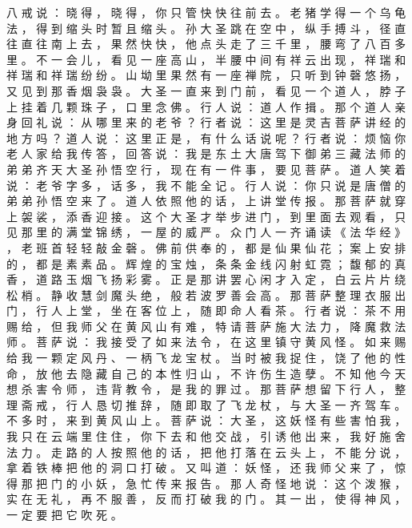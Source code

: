 {八 戒 说 ： 晓 得 ， 晓 得 ， 你 只 管 快 快 往 前 去 。
老 猪 学 得 一 个 乌 龟 法 ， 得 到 缩 头 时 暂 且 缩 头 。
孙 大 圣 跳 在 空 中 ， 纵 手 搏 斗 ， 径 直 往 直 往 南 上 去 ， 果 然 快 快 ， 他 点 头 走 了 三 千 里 ， 腰 弯 了 八 百 多 里 。
不 一 会 儿 ， 看 见 一 座 高 山 ， 半 腰 中 间 有 祥 云 出 现 ， 祥 瑞 和 祥 瑞 和 祥 瑞 纷 纷 。
山 坳 里 果 然 有 一 座 禅 院 ， 只 听 到 钟 磬 悠 扬 ， 又 见 到 那 香 烟 袅 袅 。
大 圣 一 直 来 到 门 前 ， 看 见 一 个 道 人 ， 脖 子 上 挂 着 几 颗 珠 子 ， 口 里 念 佛 。
行 人 说 ： 道 人 作 揖 。
那 个 道 人 亲 身 回 礼 说 ： 从 哪 里 来 的 老 爷 ？ 行 者 说 ： 这 里 是 灵 吉 菩 萨 讲 经 的 地 方 吗 ？ 道 人 说 ： 这 里 正 是 ， 有 什 么 话 说 呢 ？ 行 者 说 ： 烦 恼 你 老 人 家 给 我 传 答 ， 回 答 说 ： 我 是 东 土 大 唐 驾 下 御 弟 三 藏 法 师 的 弟 弟 齐 天 大 圣 孙 悟 空 行 ， 现 在 有 一 件 事 ， 要 见 菩 萨 。
道 人 笑 着 说 ： 老 爷 字 多 ， 话 多 ， 我 不 能 全 记 。
行 人 说 ： 你 只 说 是 唐 僧 的 弟 弟 孙 悟 空 来 了 。
道 人 依 照 他 的 话 ， 上 讲 堂 传 报 。
那 菩 萨 就 穿 上 袈 裟 ， 添 香 迎 接 。
这 个 大 圣 才 举 步 进 门 ， 到 里 面 去 观 看 ， 只 见 那 里 的 满 堂 锦 绣 ， 一 屋 的 威 严 。
众 门 人 一 齐 诵 读 《 法 华 经 》 ， 老 班 首 轻 轻 敲 金 磬 。
佛 前 供 奉 的 ， 都 是 仙 果 仙 花 ； 案 上 安 排 的 ， 都 是 素 素 品 。
辉 煌 的 宝 烛 ， 条 条 金 线 闪 射 虹 霓 ； 馥 郁 的 真 香 ， 道 路 玉 烟 飞 扬 彩 雾 。
正 是 那 讲 罢 心 闲 才 入 定 ， 白 云 片 片 绕 松 梢 。
静 收 慧 剑 魔 头 绝 ， 般 若 波 罗 善 会 高 。
那 菩 萨 整 理 衣 服 出 门 ， 行 人 上 堂 ， 坐 在 客 位 上 ， 随 即 命 人 看 茶 。
行 者 说 ： 茶 不 用 赐 给 ， 但 我 师 父 在 黄 风 山 有 难 ， 特 请 菩 萨 施 大 法 力 ， 降 魔 救 法 师 。
菩 萨 说 ： 我 接 受 了 如 来 法 令 ， 在 这 里 镇 守 黄 风 怪 。
如 来 赐 给 我 一 颗 定 风 丹 、 一 柄 飞 龙 宝 杖 。
当 时 被 我 捉 住 ， 饶 了 他 的 性 命 ， 放 他 去 隐 藏 自 己 的 本 性 归 山 ， 不 许 伤 生 造 孽 。
不 知 他 今 天 想 杀 害 令 师 ， 违 背 教 令 ， 是 我 的 罪 过 。
那 菩 萨 想 留 下 行 人 ， 整 理 斋 戒 ， 行 人 恳 切 推 辞 ， 随 即 取 了 飞 龙 杖 ， 与 大 圣 一 齐 驾 车 。
不 多 时 ， 来 到 黄 风 山 上 。
菩 萨 说 ： 大 圣 ， 这 妖 怪 有 些 害 怕 我 ， 我 只 在 云 端 里 住 住 ， 你 下 去 和 他 交 战 ， 引 诱 他 出 来 ， 我 好 施 舍 法 力 。
走 路 的 人 按 照 他 的 话 ， 把 他 打 落 在 云 头 上 ， 不 能 分 说 ， 拿 着 铁 棒 把 他 的 洞 口 打 破 。
又 叫 道 ： 妖 怪 ， 还 我 师 父 来 了 ， 惊 得 那 把 门 的 小 妖 ， 急 忙 传 来 报 告 。
那 人 奇 怪 地 说 ： 这 个 泼 猴 ， 实 在 无 礼 ， 再 不 服 善 ， 反 而 打 破 我 的 门 。
其 一 出 ， 使 得 神 风 ， 一 定 要 把 它 吹 死 。
}
